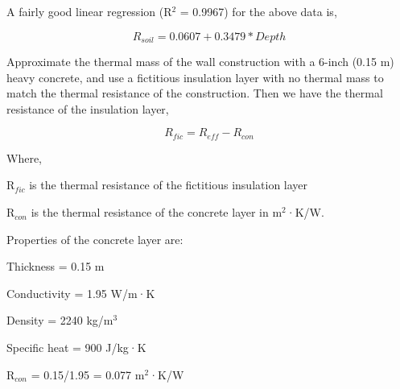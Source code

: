 A fairly good linear regression (R\(^{2}\) = 0.9967) for the above data is,

\begin{equation}
R_{soil} = 0.0607 + 0.3479 * Depth
\end{equation}

Approximate the thermal mass of the wall construction with a 6-inch (0.15 m) heavy concrete, and use a fictitious insulation layer with no thermal mass to match the thermal resistance of the construction. Then we have the thermal resistance of the insulation layer,

\begin{equation}
R_{fic} = R_{eff} - R_{con}
\end{equation}

Where,

R\(_{fic}\) is the thermal resistance of the fictitious insulation layer

R\(_{con}\) is the thermal resistance of the concrete layer in m\(^{2}\)·K/W.

Properties of the concrete layer are:

Thickness = 0.15 m

Conductivity = 1.95 W/m·K

Density = 2240 kg/m\(^{3}\)

Specific heat = 900 J/kg·K

R\(_{con}\) = 0.15/1.95 = 0.077 m\(^{2}\)·K/W
